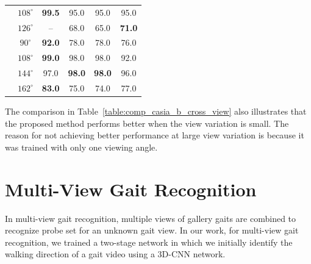 \begin{table}
{\begin{tabular*}{29pc}{c|c|cccc}
		&$108^{\circ}$ &\textbf{99.5} &95.0 &95.0 &95.0 \\ \rule{0pt}{2ex}
	
		&$126^{\circ}$ &-- &68.0 &65.0 &\textbf{71.0} \\\hline\rule{0pt}{3ex}
	
	
	\multirow{4}{*}{$126^{\circ}$} &$90^{\circ}$ &\textbf{92.0} &78.0 &78.0 &76.0 \\\rule{0pt}{2ex}
			&$108^{\circ}$ &\textbf{99.0} &98.0 &98.0 &92.0 \\\rule{0pt}{2ex}
			&$144^{\circ}$ &97.0 &\textbf{98.0} &\textbf{98.0} &96.0 \\\rule{0pt}{2ex}
			&$162^{\circ}$ &\textbf{83.0} &75.0 &74.0 &77.0 \\\hline
	\end{tabular*}}{} 
\end{table}

The comparison in Table~\ref{table:comp_casia_b_cross_view} also illustrates that the proposed method performs better when the view variation is small. The reason for not achieving better performance at large view variation is because it was trained with only one viewing angle.  



\section{Multi-View Gait Recognition}
In multi-view gait recognition, multiple views of gallery gaits are combined to recognize probe set for an unknown gait view. In our work, for multi-view gait recognition, we trained a two-stage network in which we initially identify the walking direction of a gait video using a 3D-CNN network. 

